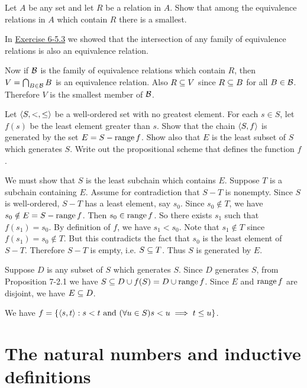 \begin{exercise}
Let $A$ be any set and let $R$ be a relation in $A$. Show that among the equivalence
relations in $A$ which contain $R$ there is a smallest.
\end{exercise}

\begin{solution}
In \hyperref[ex:6-5.3]{Exercise 6-5.3} we showed that the intersection of any family
of equivalence relations is also an equivalence relation.

Now if $\mathcal{B}$ is the family of equivalence relations which contain $R$,
then $V=\bigcap_{B\in\mathcal{B}}B$ is an equivalence relation. Also $R\subseteq V$ since
$R\subseteq B$ for all $B\in\mathcal{B}$. Therefore $V$ is the smallest member of $\mathcal{B}$.
\end{solution}

\begin{exercise}
Let $\left\langle S,<,\leq\right\rangle$ be a well-ordered set with no greatest element. For each $s \in S$,
let $f(s)$ be the least element greater than $s$. Show that the chain $\left\langle S,f\right\rangle$ is generated by
the set $E = S- \operatorname{range} f$. Show also that $E$ is the least subset of $S$ which generates $S$.
Write out the propositional scheme that defines the function $f$.
\end{exercise}

\begin{solution}
We must show that $S$ is the least subchain which contains $E$.
Suppose $T$ is a subchain containing $E$. Assume for contradiction that $S-T$ is nonempty.
Since $S$ is well-ordered, $S-T$ has a least element, say $s_0$.
Since $s_0\nin T$, we have $s_0\notin E=S-\operatorname{range} f$. Then $s_0\in\operatorname{range} f$.
So there exists $s_1$ such that $f(s_1)=s_0$.
By definition of $f$, we have $s_1<s_0$.
Note that $s_1\nin T$ since $f(s_1)=s_0\nin T$.
But this contradicts the fact that $s_0$ is the least element of $S-T$.
Therefore $S-T$ is empty, i.e. $S\subseteq T$.
Thus $S$ is generated by $E$.

Suppose $D$ is any subset of $S$ which generates $S$.
Since $D$ generates $S$, from Proposition 7-2.1 we have $S\subseteq D\cup f(S)=D\cup\operatorname{range} f$.
Since $E$ and $\operatorname{range} f$ are disjoint, we have $E\subseteq D$.

We have $f=\left\{ \left\langle s,t\right\rangle : s<t\text{ and } (\forall u\in S) s < u \implies t\leq u \right\}$.
\end{solution}

\section{The natural numbers and inductive definitions}

